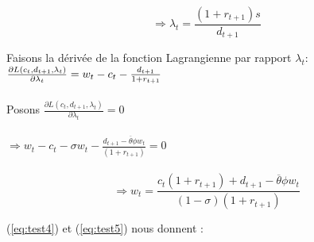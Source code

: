 \documentclass[11pt,twoside,a4paper]{article}
\begin{document}
  \begin{equation}\label{eq:test5}
  \Rightarrow \lambda_t=\frac{(1+r_{t+1})s}{ d_{t+1}}
\end{equation}  

Faisons la dérivée de la fonction Lagrangienne par rapport $\lambda_t :  $ \\
$\\
\frac{\partial L(c_t,d_{t+1},\lambda_t)}{\partial \lambda_t} = w_t-c_t - \frac{d_{t+1}}{1+r_{t+1}} 
$ \\ \\
Posons  $ \frac{\partial L(c_t,d_{t+1},\lambda_t)}{\partial \lambda_t} = 0 $ \\ \\
$\Rightarrow w_t-c_t - \sigma w_t-\frac{d_{t+1}-\overline{\theta}\phi w_t}{(1+r_{t+1})}=0$\\ \\
 \begin{equation}\label{eq:test6}
  \Rightarrow w_t = \frac{c_t(1+r_{t+1}) + d_{t+1}-\overline{\theta}\phi w_t}{(1-\sigma)(1+r_{t+1})}
\end{equation}
    

(\ref{eq:test4}) et (\ref{eq:test5}) nous donnent : \\
\end{document}
